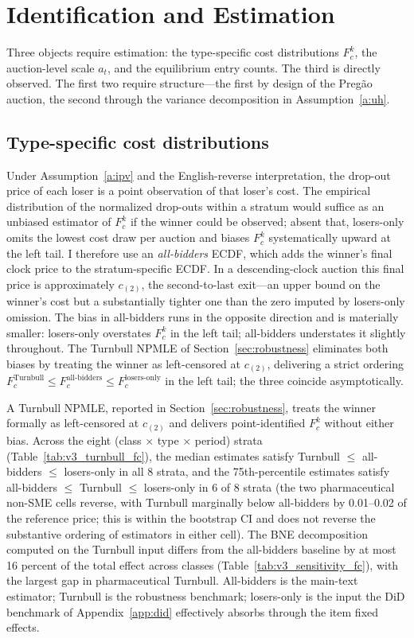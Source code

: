 \section{Identification and Estimation}\label{sec:identification}

Three objects require estimation: the type-specific cost distributions $F_c^k$, the auction-level scale $a_t$, and the equilibrium entry counts. The third is directly observed. The first two require structure---the first by design of the Preg\~ao auction, the second through the variance decomposition in Assumption~\ref{a:uh}.

\subsection{Type-specific cost distributions}

Under Assumption~\ref{a:ipv} and the English-reverse interpretation, the drop-out price of each loser is a point observation of that loser's cost. The empirical distribution of the normalized drop-outs within a stratum would suffice as an unbiased estimator of $F_c^k$ if the winner could be observed; absent that, losers-only omits the lowest cost draw per auction and biases $F_c^k$ systematically upward at the left tail. I therefore use an \emph{all-bidders} ECDF, which adds the winner's final clock price to the stratum-specific ECDF. In a descending-clock auction this final price is approximately $c_{(2)}$, the second-to-last exit---an upper bound on the winner's cost but a substantially tighter one than the zero imputed by losers-only omission. The bias in all-bidders runs in the opposite direction and is materially smaller: losers-only overstates $F_c^k$ in the left tail; all-bidders understates it slightly throughout. The Turnbull NPMLE of Section~\ref{sec:robustness} eliminates both biases by treating the winner as left-censored at $c_{(2)}$, delivering a strict ordering $F_c^{\text{Turnbull}} \le F_c^{\text{all-bidders}} \le F_c^{\text{losers-only}}$ in the left tail; the three coincide asymptotically.

A Turnbull NPMLE, reported in Section~\ref{sec:robustness}, treats the winner formally as left-censored at $c_{(2)}$ and delivers point-identified $F_c^k$ without either bias. Across the eight (class $\times$ type $\times$ period) strata (Table~\ref{tab:v3_turnbull_fc}), the median estimates satisfy Turnbull $\le$ all-bidders $\le$ losers-only in all 8 strata, and the 75th-percentile estimates satisfy all-bidders $\le$ Turnbull $\le$ losers-only in 6 of 8 strata (the two pharmaceutical non-SME cells reverse, with Turnbull marginally below all-bidders by 0.01--0.02 of the reference price; this is within the bootstrap CI and does not reverse the substantive ordering of estimators in either cell). The BNE decomposition computed on the Turnbull input differs from the all-bidders baseline by at most 16 percent of the total effect across classes (Table~\ref{tab:v3_sensitivity_fc}), with the largest gap in pharmaceutical Turnbull. All-bidders is the main-text estimator; Turnbull is the robustness benchmark; losers-only is the input the DiD benchmark of Appendix~\ref{app:did} effectively absorbs through the item fixed effects.

